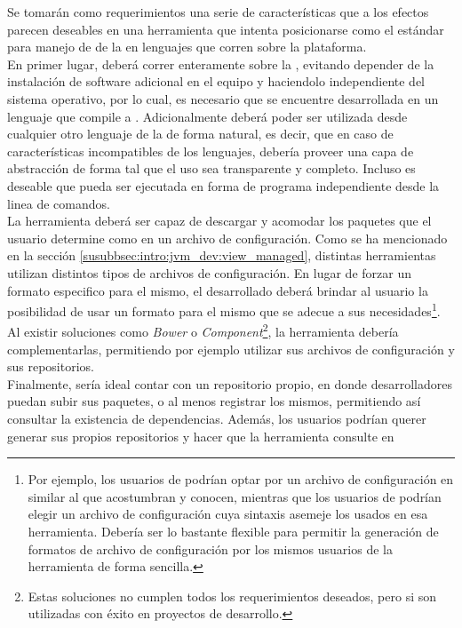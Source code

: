 Se tomarán como requerimientos una serie de características que a los efectos
parecen deseables en una herramienta que intenta posicionarse como el
estándar para manejo de \dependencies de la \viewtier en lenguajes que corren
sobre la plataforma.\\
En primer lugar, deberá correr enteramente sobre la \jvm, evitando depender de
la instalación de software adicional en el equipo y haciendolo independiente
del sistema operativo, por lo cual, es necesario que se encuentre desarrollada
en un lenguaje que compile a \bytecode \java.
Adicionalmente deberá poder ser utilizada desde cualquier otro lenguaje de
la \jvm de forma natural, es decir, que en caso de características incompatibles
de los lenguajes, debería proveer una capa de abstracción de forma tal que
el uso sea transparente y completo. Incluso es deseable que pueda ser
ejecutada en forma de programa independiente desde la linea de comandos.\\
La herramienta deberá ser capaz de descargar y acomodar los paquetes que el
usuario determine como \dependencies en un archivo de configuración. Como se ha
mencionado en la sección \ref{susubbsec:intro:jvm_dev:view_managed}, distintas
herramientas utilizan distintos tipos de archivos de configuración. En lugar de
forzar un formato especifico para el mismo, el \depmgr desarrollado deberá
brindar al usuario la posibilidad de usar un formato para el mismo que se
adecue a sus necesidades\footnote{
	Por ejemplo, los usuarios de \apache \maven podrían optar por un archivo
	de configuración en \xml similar al que acostumbran y conocen, mientras
	que los usuarios de \sbt podrían elegir un archivo de configuración cuya
	sintaxis asemeje los usados en esa herramienta. Debería ser lo bastante flexible
	para permitir la generación de formatos de archivo de configuración por los
	mismos usuarios de la herramienta de forma sencilla.
}.\\
Al existir soluciones como \emph{Bower} o \emph{Component}\footnote{
	Estas soluciones no cumplen todos los requerimientos deseados, pero si son
	utilizadas con éxito en proyectos de desarrollo.
}, la herramienta debería complementarlas, permitiendo por ejemplo
utilizar sus archivos de configuración y sus repositorios.\\
Finalmente, sería ideal contar con un repositorio propio, en donde desarrolladores
puedan subir sus paquetes, o al menos registrar los mismos, permitiendo así
consultar la existencia de dependencias. Además, los usuarios podrían querer
generar sus propios repositorios y hacer que la herramienta consulte en
